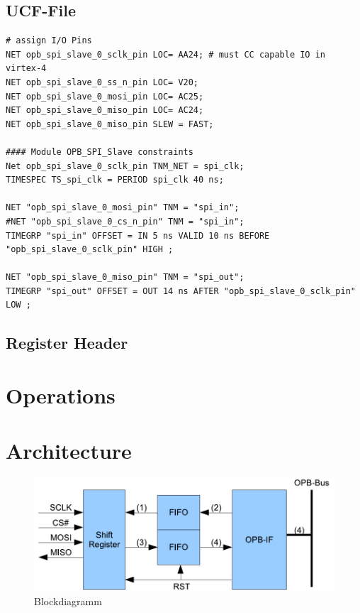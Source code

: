 \section{UCF-File}
\begin{verbatim}
# assign I/O Pins 
NET opb_spi_slave_0_sclk_pin LOC= AA24; # must CC capable IO in virtex-4
NET opb_spi_slave_0_ss_n_pin LOC= V20;
NET opb_spi_slave_0_mosi_pin LOC= AC25;
NET opb_spi_slave_0_miso_pin LOC= AC24;
NET opb_spi_slave_0_miso_pin SLEW = FAST;

#### Module OPB_SPI_Slave constraints
Net opb_spi_slave_0_sclk_pin TNM_NET = spi_clk;
TIMESPEC TS_spi_clk = PERIOD spi_clk 40 ns;

NET "opb_spi_slave_0_mosi_pin" TNM = "spi_in";
#NET "opb_spi_slave_0_cs_n_pin" TNM = "spi_in";
TIMEGRP "spi_in" OFFSET = IN 5 ns VALID 10 ns BEFORE "opb_spi_slave_0_sclk_pin" HIGH ;

NET "opb_spi_slave_0_miso_pin" TNM = "spi_out";
TIMEGRP "spi_out" OFFSET = OUT 14 ns AFTER "opb_spi_slave_0_sclk_pin" LOW ;
\end{verbatim}

\section{Register Header}




\chapter{Operations}


\chapter{Architecture}

\begin{figure}[h]
	\centering
		\includegraphics[width=1.00\textwidth]{Grafik/block_diagramm}
	\caption{Blockdiagramm}
	\label{fig:blockdiagramm}
\end{figure}

